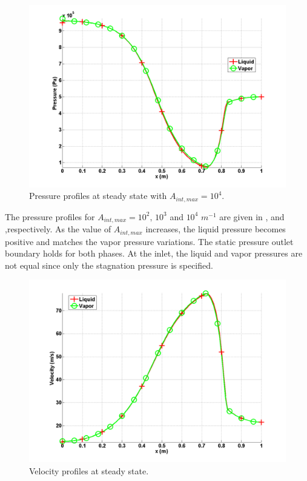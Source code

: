 %
\begin{figure}[H]
\centering
\includegraphics[width=\textwidth]{figures/SEM/Aint1e4_two_phases_pressure.png}
\caption{Pressure profiles at steady state with $A_{int,max} = 10^4$.}
\label{fig:two-fluids-rel-nozzle-press-Aint4-sem-sect4}
\end{figure}
%
The pressure profiles for $A_{int,max} = 10^2 \text{, } 10^3$ and $10^4$ $m^{-1}$ are given in ,  and  ,respectively. As the value of $A_{int,max}$ increases, the liquid pressure becomes positive and matches the vapor pressure variations. The static pressure outlet boundary holds for both phases. At the inlet, the liquid and vapor pressures are not equal since only the stagnation pressure is specified.
%
\begin{figure}[H]
\centering
\includegraphics[width=\textwidth]{figures/SEM/Aint1e4_two_phases_velocity.png}
\caption{Velocity profiles at steady state.}
\label{fig:two-fluids-rel-nozzle-vel-sem-sect4}
\end{figure}
